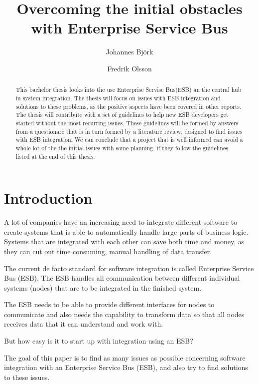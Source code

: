 \documentclass{llncs}
\title{Overcoming the initial obstacles with Enterprise Service Bus}
\author{Johannes Björk \inst{1} \and Fredrik Olsson \inst{1}}
\institute{
	Blekinge Institute of Technology \\
	\email{johannes@johannesbjork.se}, \email{spooky.bender@gmail.com}
}
\begin{document}
\maketitle

\begin{abstract}
This bachelor thesis looks into the use Enterprise Servise Bus(ESB) an the central hub in system integration. The thesis will focus on issues with ESB integration and solutions to these problems, as the positive aspects have been covered in other reports. 
The thesis will contribute with a set of guidelines to help new ESB developers get started without the most recurring issues. These guidelines will be formed by answers from a questionare that is in turn formed by a literature review, designed to find issues with ESB integration.
We can conclude that a project that is well informed can avoid a whole lot of the the initial issues with some planning, if they follow the guidelines listed at the end of this thesis.

\end{abstract}

\newpage
\setcounter{tocdepth}{3}
\newpage

\section{Introduction}
A lot of companies have an increasing need to integrate different software to create systems that is able to automatically handle large parts of business logic. Systems that are integrated with each other can save both time and money, as they can cut out time consuming, manual handling of data transfer.

The current de facto standard for software integration is called Enterprise Service Bus (ESB)\cite{esb}. The ESB handles all communication between different individual systems (nodes) that are to be integrated in the finished system.

The ESB needs to be able to provide different interfaces for nodes to communicate and also needs the capability to transform data so that all nodes receives data that it can understand and work with.

But how easy is it to start up with integration using an ESB?

The goal of this paper is to find as many  issues as possible concerning software integration with an Enterprise Service Bus (ESB), and also try to find solutions to these issues.
\end{document}
